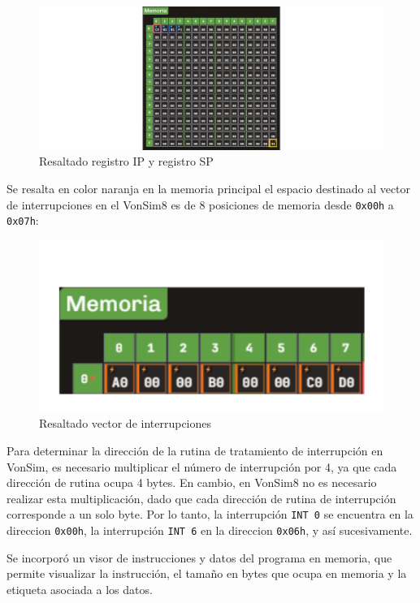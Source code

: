 \documentclass[12pt,oneside]{templates/unerthesis}
\begin{document}
\begin{figure}

{\centering \includegraphics[width=1\linewidth]{images/resaltadoipsp} 

}

\caption{Resaltado registro IP y registro SP}\label{fig:resaltadoip}
\end{figure}

Se resalta en color naranja en la memoria principal el espacio destinado al vector de interrupciones en el VonSim8 es de 8 posiciones de memoria desde \texttt{0x00h} a \texttt{0x07h}:

\begin{figure}

{\centering \includegraphics[width=0.5\linewidth]{images/resaltadoint} 

}

\caption{Resaltado vector de interrupciones}\label{fig:resaltadointsp}
\end{figure}

Para determinar la dirección de la rutina de tratamiento de interrupción en VonSim, es necesario multiplicar el número de interrupción por 4, ya que cada dirección de rutina ocupa 4 bytes. En cambio, en VonSim8 no es necesario realizar esta multiplicación, dado que cada dirección de rutina de interrupción corresponde a un solo byte. Por lo tanto, la interrupción \texttt{INT\ 0} se encuentra en la direccion \texttt{0x00h}, la interrupción \texttt{INT\ 6} en la direccion \texttt{0x06h}, y así sucesivamente.

Se incorporó un visor de instrucciones y datos del programa en memoria, que permite visualizar la instrucción, el tamaño en bytes que ocupa en memoria y la etiqueta asociada a los datos.
\end{document}
